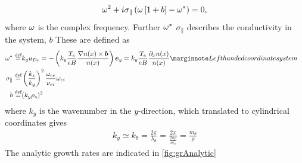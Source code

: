 %
\begin{align}
    \omega^2+i\sigma_\|\left(\omega\left[1+b\right]-\omega^*\right) = 0,
    \label{eq:analyticDisp}
\end{align}
%
where $\omega$ is the complex frequency.
Further $\omega^*$ $\sigma_\|$ describes the conductivity in the system, $b$
These are defined as
%
\begin{align*}
    \om^* \defined& k_y u_{De} =
    -\L(k_y \frac{T_e}{eB}\frac{\grad n(x)\times \ve{b}}{n(x)}\R)\ve{e}_y
    =
    k_y \frac{T_e}{eB}\frac{\partial_x n(x)}{n(x)}
    \note{Left handed coordinate system}
    \\
    \sigma_\| \defined& \L(\frac{k_z}{k_y}\R)^2 \frac{\om_{ce}}{\nu_{ei}}\om_{ci}\\
    b \defined& (k_y \rho_s)^2&
\end{align*}
%
where $k_y$ is the wavenumber in the $y$-direction, which translated to cylindrical coordinates gives
%
\begin{align*}
    k_y \simeq k_\theta
    = \frac{2\pi}{\lambda_\theta}
    = \frac{2\pi}{\frac{2\pi \rho}{m_\theta}}
    = \frac{m_\theta}{\rho}
\end{align*}
%
The analytic growth rates are indicated in \cref{fig:grAnalytic}
%
